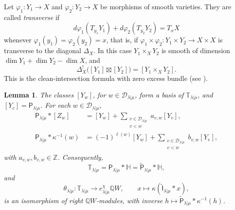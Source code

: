 \documentclass[11pt,a4paper]{amsart}
\newtheorem{lemma}[theorem]{Lemma}
\theoremstyle{definition}
\theoremstyle{remark}
\newcommand{\Q}{\mathbb Q}
\newcommand{\bH}{\mathbb H}
\newcommand{\bT}{\mathbb T}
\newcommand{\lm}{\lambda|\mu}
\numberwithin{equation}{section}
\begin{document}
Let $\varphi_1:Y_1\to X$ and $\varphi_2:Y_2\to X$ be morphisms of smooth
varieties. They are called \emph{transverse} if
\begin{equation}\label{eq:transverse}
d\varphi_1(T_{y_1}Y_1)+d\varphi_2(T_{y_2}Y_2)=T_xX
\end{equation}
whenever $\varphi_1(y_1)=\varphi_2(y_2)=x$, that is, if
$\varphi_1\times\varphi_2:Y_1\times Y_2\to X\times X$ is transverse to the
diagonal $\Delta_X$. In this case $Y_1\times_XY_2$ is smooth of dimension
$\dim Y_1+\dim Y_2-\dim X$, and
$$
\Delta_X^!\bigl([Y_1]\boxtimes[Y_2]\bigr)=[Y_1\times_XY_2].
$$
This is the clean-intersection formula \cite[Proposition~2.6.47]{CG} with
zero excess bundle (see \cite[Section~2.6]{CG}).

\begin{lemma}\label{lem:tensor-module}
The classes $[Y_w]$, for $w\in\mathcal D_{\lm}$, form a basis of
$\bT_{\lm}$, and $[Y_e]=\mathsf P_{\lm}$. For each
$w\in\mathcal D_{\lm}$,
\begin{align}
\mathsf P_{\lm}*[Z_w]
&=[Y_w]
 +\sum_{\substack{v\in\mathcal D_{\lm}\\v<w}}
       a_{v,w}[Y_v],\label{eq:mixed-triangular-raw}\\
\mathsf P_{\lm}*\kappa^{-1}(w)
&=(-1)^{\ell(w)}[Y_w]
 +\sum_{\substack{v\in\mathcal D_{\lm}\\v<w}}
       b_{v,w}[Y_v],\label{eq:mixed-triangular-W}
\end{align}
with $a_{v,w},b_{v,w}\in\mathbb Z$. Consequently,
\begin{equation}\label{eq:geometric-cyclicity}
\bT_{\lm}=\mathsf P_{\lm}*\bH=\widetilde{\mathsf P}_{\lm}*\bH,
\end{equation}
and
\begin{equation}\label{eq:tensor-module}
\theta_{\lm}:\bT_{\lm}\longrightarrow e_{\lm}^\chi\Q W,
\qquad x\longmapsto\kappa(\widetilde{\mathsf I}_{\lm}*x),
\end{equation}
is an isomorphism of right $\Q W$-modules, with inverse
$h\mapsto \widetilde{\mathsf P}_{\lm}*\kappa^{-1}(h)$.
\end{lemma}
\end{document}
